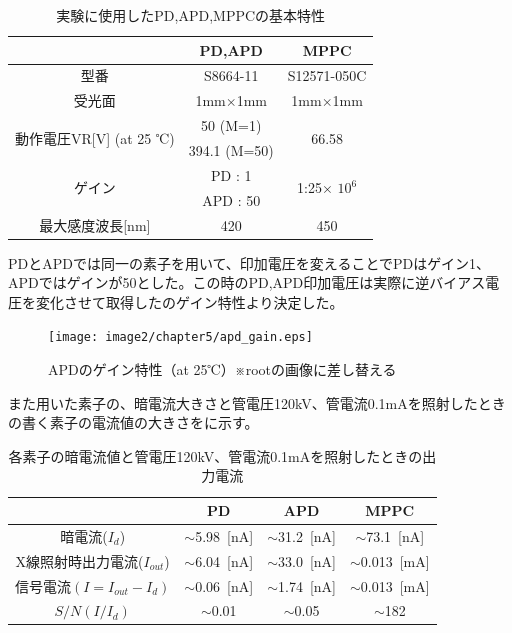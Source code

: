 \begin{table}[H]
  \centering
    \begin{tabular}{ccc}
    \toprule
          & PD,APD  & MPPC \\
    \midrule
    型番    & S8664-11 &  S12571-050C \\
    受光面   & 1mm$\times$1mm & 1mm$\times$1mm \\
    \multirow{2}[0]{*}{動作電圧VR[V] (at 25 ℃)} & 50 (M=1) & \multirow{2}[0]{*}{66.58} \\
          & 394.1 (M=50) &  \\
    \multirow{2}[0]{*}{ゲイン} & PD : 1 & \multirow{2}[0]{*}{1:25$\times$ $10^6$} \\
          & APD : 50 &  \\
    最大感度波長[nm] & 420   & 450 \\
    \bottomrule
    \end{tabular}
     \caption{実験に使用したPD,APD,MPPCの基本特性}
  \label{soshi_tokusei}
\end{table}

PDとAPDでは同一の素子を用いて、印加電圧を変えることでPDはゲイン1、APDではゲインが50とした。この時のPD,APD印加電圧は実際に逆バイアス電圧を変化させて取得したのゲイン特性より決定した。

\begin{figure}[H]
 \begin{center}
 \texttt{[image: image2/chapter5/apd\_gain.eps]}
 \end{center}
 \caption{APDのゲイン特性（at 25℃）※rootの画像に差し替える}
 \label{fig:apd_gain}
\end{figure}

また用いた素子の、暗電流大きさと管電圧120kV、管電流0.1mAを照射したときの書く素子の電流値の大きさをに示す。


\begin{table}[H]
  \centering
  \caption{各素子の暗電流値と管電圧120kV、管電流0.1mAを照射したときの出力電流}
    \begin{tabular}{cccc}
    \toprule
          & PD    & APD   & MPPC \\
    \midrule
    暗電流($I_d$) & $\sim$5.98\ [nA] & $\sim$31.2\ [nA] & $\sim$73.1\ [nA] \\
    X線照射時出力電流($I_{out}$) & $\sim$6.04\ [nA] & $\sim$33.0\ [nA] & $\sim$0.013\ [mA] \\
    $信号電流(I = I_{out} - I_d)$ & $\sim$0.06\ [nA] & $\sim$1.74\ [nA] & $\sim$0.013\ [mA] \\
    $S/N(I/I_d)$ & $\sim$0.01  & $\sim$0.05  & $\sim$182  \\
    \bottomrule
    \end{tabular}%
  \label{tab:addlabel}%
\end{table}%

